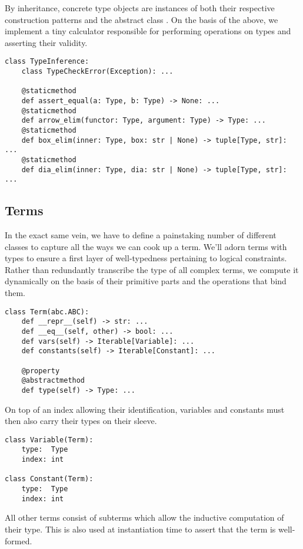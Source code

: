 \noindent By inheritance, concrete type objects are instances of both their respective construction patterns and the abstract class .
On the basis of the above, we implement a tiny calculator responsible for performing operations on types and asserting their validity.

\begin{verbatim}
class TypeInference:
    class TypeCheckError(Exception): ...

    @staticmethod
    def assert_equal(a: Type, b: Type) -> None: ...
    @staticmethod
    def arrow_elim(functor: Type, argument: Type) -> Type: ...
    @staticmethod
    def box_elim(inner: Type, box: str | None) -> tuple[Type, str]: ...
    @staticmethod
    def dia_elim(inner: Type, dia: str | None) -> tuple[Type, str]: ...
\end{verbatim}

\subsection{Terms}
In the exact same vein, we have to define a painstaking number of different classes to capture all the ways we can cook up a term.
We'll adorn terms with types to ensure a first layer of well-typedness pertaining to logical constraints.
Rather than redundantly transcribe the type of all complex terms, we compute it dynamically on the basis of their primitive parts and the operations that bind them.

\begin{verbatim}
class Term(abc.ABC):
    def __repr__(self) -> str: ...
    def __eq__(self, other) -> bool: ...
    def vars(self) -> Iterable[Variable]: ...
    def constants(self) -> Iterable[Constant]: ...

    @property
    @abstractmethod
    def type(self) -> Type: ...
\end{verbatim}

\noindent On top of an index allowing their identification, variables and constants must then also carry their types on their sleeve.

\begin{verbatim}
class Variable(Term):
    type:  Type
    index: int
    
class Constant(Term):
    type:  Type
    index: int
\end{verbatim}

\noindent All other terms consist of subterms which allow the inductive computation of their type.
This is also used at instantiation time to assert that the term is well-formed.

